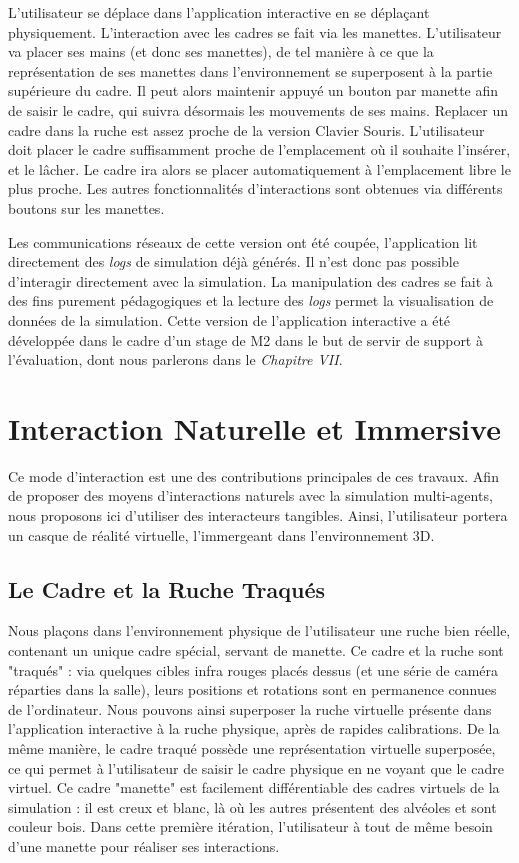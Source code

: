 		 L'utilisateur se déplace dans l'application interactive en se déplaçant physiquement. L'interaction avec les cadres se fait via les manettes. L'utilisateur va placer ses mains (et donc ses manettes), de tel manière à ce que la représentation de ses manettes dans l'environnement se superposent à la partie supérieure du cadre. Il peut alors maintenir appuyé un bouton par manette afin de saisir le cadre, qui suivra désormais les mouvements de ses mains. Replacer un cadre dans la ruche est assez proche de la version Clavier Souris. L'utilisateur doit placer le cadre suffisamment proche de l'emplacement où il souhaite l'insérer, et le lâcher. Le cadre ira alors se placer automatiquement à l'emplacement libre le plus proche. Les autres fonctionnalités d'interactions sont obtenues via différents boutons sur les manettes.
		
		Les communications réseaux de cette version ont été coupée, l'application lit directement des \textit{logs} de simulation déjà générés. Il n'est donc pas possible d'interagir directement avec la simulation. La manipulation des cadres se fait à des fins purement pédagogiques et la lecture des \textit{logs} permet la visualisation de données de la simulation. Cette version de l'application interactive a été développée dans le cadre d'un stage de M2 dans le but de servir de support à l'évaluation, dont nous parlerons dans le \textit{Chapitre VII}.
		
		
	\section{Interaction Naturelle et Immersive}
	
	Ce mode d'interaction est une des contributions principales de ces travaux. Afin de proposer des moyens d'interactions naturels avec la simulation multi-agents, nous proposons ici d'utiliser des interacteurs tangibles. Ainsi, l'utilisateur portera un casque de réalité virtuelle, l'immergeant dans l'environnement 3D.

		\subsection{Le Cadre et la Ruche Traqués}
		Nous plaçons dans l'environnement physique de l'utilisateur une ruche bien réelle, contenant un unique cadre spécial, servant de manette. Ce cadre et la ruche sont "traqués" : via quelques cibles infra rouges placés dessus (et une série de caméra réparties dans la salle), leurs positions et rotations sont en permanence connues de l'ordinateur. Nous pouvons ainsi superposer la ruche virtuelle présente dans l'application interactive à la ruche physique, après de rapides calibrations. De la même manière, le cadre traqué possède une représentation virtuelle superposée, ce qui permet à l'utilisateur de saisir le cadre physique en ne voyant que le cadre virtuel. Ce cadre "manette" est facilement différentiable des cadres virtuels de la simulation : il est creux et blanc, là où les autres présentent des alvéoles et sont couleur bois. Dans cette première itération, l'utilisateur à tout de même besoin d'une manette pour réaliser ses interactions.
		
